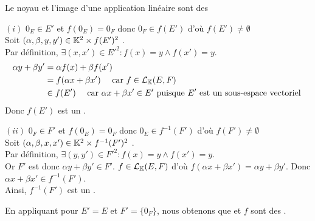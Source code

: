 \documentclass{article}
\begin{document}
	\begin{question_kholle}
		[Soit $f \in \mathcal{L}_\K(E, F)$.
		\begin{equation}
			\begin{aligned}
				\Ker{f} &= \left\{ x \in E \;|\; f(x) = 0_F \right\} = f^{-1} (\{0_F\}) \\
				\Im f &= \left\{ y \in F \;|\; \exists x \in E : f(x) = y \right\}
			\end{aligned}
		\end{equation}
		Nous démontrerons le résultat plus général suivant :
		\begin{propositions}
			\item $f(E')$ est un \sev de $F$.
			\item $f^{-1}(F')$ est un \sev de $E$.
		\end{propositions}
		]
		{Le noyau et l'image d'une application linéaire sont des \sevs}
		
		$(i)$ $0_E \in E'$ et $f(0_E) = 0_F$ donc $0_F \in f(E')$ d'où $f(E') \neq \emptyset$ \\
		Soit $(\alpha, \beta, y, y') \in \mathbb K^2 \times f(E')^2$ \fqs. \\
		Par définition, $\exists (x, x') \in E'^2 : f(x) = y \wedge f(x') = y$.
		\begin{equation*}
			\begin{aligned}
				\alpha y + \beta y'
				&= \alpha f(x) + \beta f(x') \\
				&= f( \alpha x + \beta x' ) \quad \text{ car } f \in \mathcal{L}_{\mathbb K}(E, F) \\
				&\in f(E') \quad \text{ car } \alpha x + \beta x' \in E' \text{ puisque } E' \text{ est un sous-espace vectoriel }
			\end{aligned}
		\end{equation*}
		Donc $f(E')$ est un \sev.
		
		$(ii)$ $0_F \in F'$ et $f(0_E) = 0_F$ donc $0_E \in f^{-1}(F')$ d'où $f(F') \neq \emptyset$ \\
		Soit $(\alpha, \beta, x, x') \in \mathbb K^2 \times f^{-1}(F')^2$ \fqs. \\
		Par définition, $\exists (y, y') \in F'^2 : f(x) = y \wedge f(x') = y$. \\
		Or $F'$ est \sev donc $\alpha y + \beta y' \in F'$. $f \in \mathcal{L}_\K(E, F)$ d'où $f(\alpha x + \beta x') = \alpha y + \beta y'$. Donc $\alpha x + \beta x' \in f^{-1}(F')$. \\
		Ainsi, $f^{-1}(F')$ est un \sev.
		
		En appliquant pour $E' = E$ et $F' = \{0_F\}$, nous obtenons que  et \Im $f$ sont des \sevs.
	\end{question_kholle}
\end{document}
